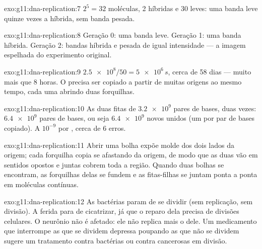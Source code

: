 \begin{solution}{exo:g11:dna-replication:7}
$2^5 = 32$ moléculas, 2 híbridas e 30 leves: uma banda leve quinze
vezes a híbrida, sem banda pesada.
\end{solution}

\begin{solution}{exo:g11:dna-replication:8}
Geração 0: uma banda leve. Geração 1: uma banda híbrida. Geração 2:
bandas híbrida e pesada de igual intensidade --- a imagem espelhada do
experimento original.
\end{solution}

\begin{solution}{exo:g11:dna-replication:9}
$\num{2.5e8}/50 = \num{5e6}\,\unit{s}$, cerca de 58 dias --- muito mais
que 8 horas. O  precisa ser copiado a partir de muitas
origens ao mesmo tempo, cada uma abrindo duas forquilhas.
\end{solution}

\begin{solution}{exo:g11:dna-replication:10}
As duas fitas de $\num{3.2e9}$ pares de bases, duas vezes:
$\num{6.4e9}$ pares de bases, ou seja $\num{6.4e9}$  novos
unidos (um por par de bases copiado). A $10^{-9}$ por ,
cerca de 6 erros.
\end{solution}

\begin{solution}{exo:g11:dna-replication:11}
Abrir uma bolha expõe molde dos dois lados da origem; cada forquilha
copia se afastando da origem, de modo que as duas vão em sentidos
opostos e juntas cobrem toda a região. Quando duas bolhas se encontram,
as forquilhas delas se fundem e as fitas-filhas se juntam ponta a ponta
em moléculas contínuas.
\end{solution}

\begin{solution}{exo:g11:dna-replication:12}
As bactérias param de se dividir (sem replicação, sem divisão). A
ferida para de cicatrizar, já que o reparo dela precisa de divisões
celulares. O neurônio não é afetado: ele não replica mais o  dele.
Um medicamento que interrompe as  que se dividem depressa
poupando as que não se dividem sugere um tratamento contra bactérias ou
contra  cancerosas em divisão.
\end{solution}

